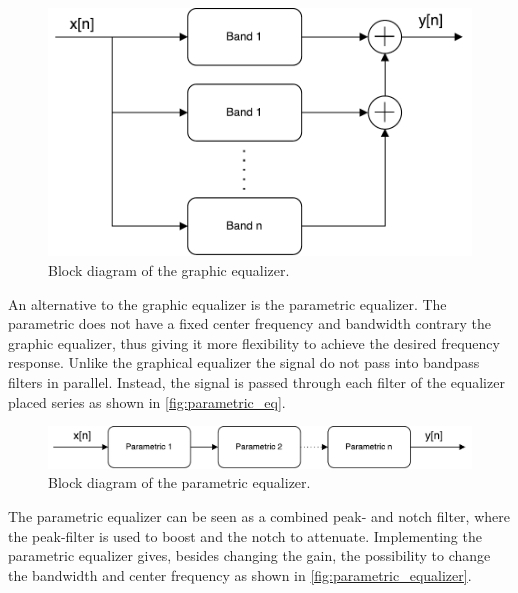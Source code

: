 \begin{figure}[H]
\centering
\includegraphics[width=0.6 \textwidth]{figures/graphic_eq_block.pdf}
\caption{Block diagram of the graphic equalizer.}
\label{fig:graphic_eq_block}
\end{figure}

An alternative to the graphic equalizer is the parametric equalizer. The parametric does not have a fixed center frequency and bandwidth contrary the graphic equalizer, thus giving it more flexibility to achieve the desired frequency response. Unlike the graphical equalizer the signal do not pass into bandpass filters in parallel. Instead, the signal is passed through each filter of the equalizer placed series as shown in \autoref{fig:parametric_eq}. \\

\begin{figure}[H]
\centering
\includegraphics[width=0.8 \textwidth]{figures/parametric_eq.pdf}
\caption{Block diagram of the parametric equalizer.}
\label{fig:parametric_eq}
\end{figure}

The parametric equalizer can be seen as a combined peak- and notch filter, where the peak-filter is used to boost and the notch to attenuate. Implementing the parametric equalizer gives, besides changing the gain, the possibility to change the bandwidth and center frequency as shown in \autoref{fig:parametric_equalizer}.

